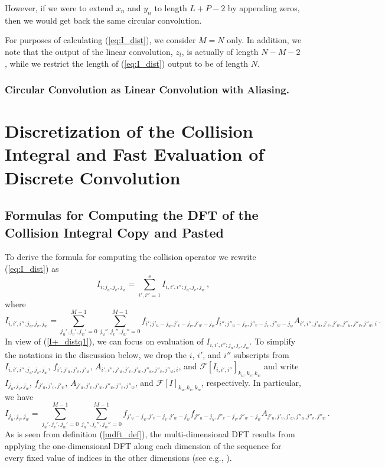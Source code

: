 \documentclass[12pt]{CSUNthesis}
\def\calF{\mathcal{F}}
\begin{document}
However, if we were to extend $x_n$ and $y_n$ to length $L + P -2 $ by appending zeros, then we would get back the same circular convolution. 
	
	For purposes of calculating (\ref{eq:I_dist}), we consider $M=N$ only. In addition, we note that the output of the linear convolution, $z_l$, is actually of length $N-M-2$, while we restrict the length of (\ref{eq:I_dist}) output to be of length $N$.
\subsection{Circular Convolution as Linear Convolution with Aliasing.}





\chapter{Discretization of the Collision Integral and Fast Evaluation of Discrete Convolution}


\section{Formulas for Computing the DFT of the Collision Integral Copy and Pasted}
To derive the formula for computing the collision operator we rewrite (\ref{eq:I_dist}) as
\begin{equation}
\label{I+_distq1}
I_{i;j_{u},j_{v},j_{w}}= \sum_{i',i''=1}^s I_{i,i',i'';j_{u},j_{v},j_{w}} \, ,
\end{equation}
where 
\begin{equation*}
I_{i,i',i'';j_{u},j_{v},j_{w}}=  \sum_{j_u',j_v',j_w'=0}^{M-1} \sum_{j_u'',j_v'',j_w''=0}^{M-1} f_{i';j'_{u}-j_{u},j'_{v}-j_{v},j'_{w}-j_{w}} f_{i'';j''_{u}-j_{u},j''_{v}-j_{v},j''_{w}-j_{w}} A_{i',i'';j'_{u},j'_{v},j'_{w},j''_u,j''_{v},j''_{w};i}\, .
\end{equation*}
In view of (\ref{I+_distq1}), we can focus on evaluation of $I_{i,i',i'';j_{u},j_{v},j_{w}}$. 
To simplify the notations in the discussion below, we drop the $i$, $i'$, and $i''$ subscripts from 
$I_{i,i',i'';j_{u},j_{v},j_{w}}$, $f_{i';j'_{u},j'_{v},j'_{w}}$, 
$A_{i',i'';j'_{u},j'_{v},j'_{w},j''_u,j''_{v},j''_{w};i}$, and  $\calF[I_{i,i',i''}]_{k_{u},k_{v},k_{w}}$ 
and write $I_{j_u,j_v,j_w}$, $f_{j'_{u},j'_{v},j'_{w}}$, 
$A_{j'_{u},j'_{v},j'_{w},j''_u,j''_{v},j''_{w}}$, and $\calF[I]_{k_{u},k_{v},k_{w}}$, respectively. 
In particular, we have
\begin{equation}
\label{I_all_index}
I_{j_u,j_v,j_w}=  \sum_{j_u',j_v',j_w'=0}^{M-1} \sum_{j_u'',j_v'',j_w''=0}^{M-1}f_{j'_{u}-j_{u},j'_{v}-j_{v},j'_{w}-j_{w}} f_{j''_{u}-j_{u},j''_{v}-j_{v},j''_{w}-j_{w}} A_{j'_{u},j'_{v},j'_{w},j''_u,j''_{v},j''_{w}}\, .
\end{equation}
As is seen from definition (\ref{mdft_def}), the multi-dimensional DFT results from applying the one-dimensional DFT along each dimension of the sequence for every fixed value of indices in the other dimensions (see e.g., \cite{Nussbaumer1982}).
\end{document}
